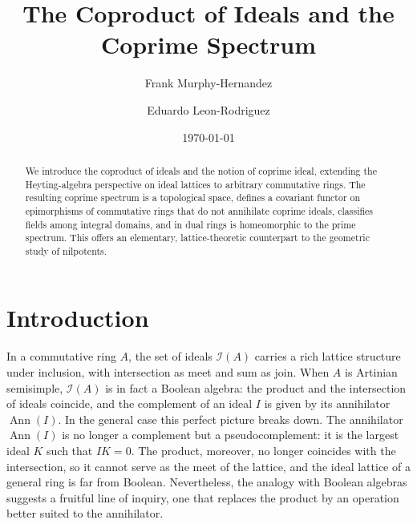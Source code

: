 \documentclass{amsart}
\DeclareMathOperator{\ann}{Ann}
\begin{document}
\title{The Coproduct of Ideals and the Coprime Spectrum}

\author{Frank Murphy-Hernandez}
\address{Facultad de Ciencias, UNAM, Mexico City}

\author{Eduardo Leon-Rodriguez}
\address{Instituto de Matem\'aticas, UNAM, Mexico City}


\date{\today}


\begin{abstract}
We introduce the coproduct of ideals and the notion of coprime ideal, extending the Heyting-algebra perspective on ideal lattices to arbitrary commutative rings. The resulting coprime spectrum is a topological space, defines a covariant functor on epimorphisms of commutative rings that do not annihilate coprime ideals, classifies fields among integral domains, and in dual rings is homeomorphic to the prime spectrum. This offers an elementary, lattice-theoretic counterpart to the geometric study of nilpotents.
\end{abstract}

\maketitle

\section{Introduction}

In a commutative ring $A$, the set of ideals $\mathcal{I}(A)$ carries a rich lattice structure under inclusion, with intersection as meet and sum as join. When $A$ is Artinian semisimple, $\mathcal{I}(A)$ is in fact a Boolean algebra: the product and the intersection of ideals coincide, and the complement of an ideal $I$ is given by its annihilator $\ann(I)$. In the general case this perfect picture breaks down. The annihilator $\ann(I)$ is no longer a complement but a pseudocomplement: it is the largest ideal $K$ such that $IK=0$. The product, moreover, no longer coincides with the intersection, so it cannot serve as the meet of the lattice, and the ideal lattice of a general ring is far from Boolean. Nevertheless, the analogy with Boolean algebras suggests a fruitful line of inquiry, one that replaces the product by an operation better suited to the annihilator.
\end{document}
